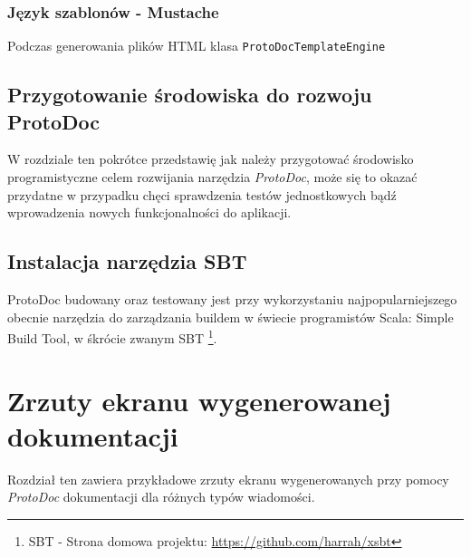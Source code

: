 \documentclass[pdflatex,11pt]{aghdpl}
\begin{document}
\subsection{Język szablonów - Mustache}
Podczas generowania plików HTML klasa \verb|ProtoDocTemplateEngine|

\section{Przygotowanie środowiska do rozwoju ProtoDoc}
\label{sec:prepare_env}
W rozdziale ten pokrótce przedstawię jak należy przygotować środowisko programistyczne celem rozwijania narzędzia \textit{ProtoDoc},
może się to okazać przydatne w przypadku chęci sprawdzenia testów jednostkowych bądź wprowadzenia nowych funkcjonalności do aplikacji.

\subsection{}

\section{Instalacja narzędzia SBT}
ProtoDoc budowany oraz testowany jest przy wykorzystaniu najpopularniejszego obecnie narzędzia do zarządzania buildem w świecie programistów Scala:
Simple Build Tool, w śkrócie zwanym SBT \footnote{SBT - Strona domowa projektu: \href{https://github.com/harrah/xsbt}{https://github.com/harrah/xsbt}}.




\newpage
\chapter{Zrzuty ekranu wygenerowanej dokumentacji}
\label{sec:screenshots}
Rozdział ten zawiera przykładowe zrzuty ekranu wygenerowanych przy pomocy \textit{ProtoDoc} dokumentacji dla różnych typów wiadomości.
\end{document}
